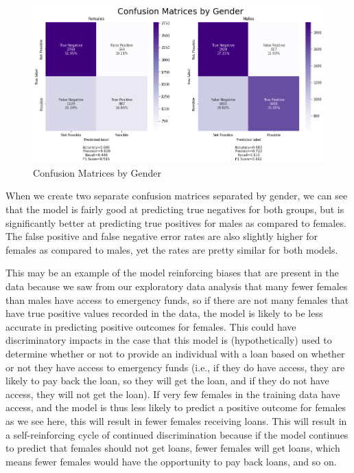 \documentclass[water,article,submit,moreauthors,pdftex]{mdpi}
\begin{document}
\begin{figure}
\centering
\includegraphics[width=\textwidth,height=0.5\textheight]{images/confusionMatrices.png}
\caption{Confusion Matrices by Gender}
\end{figure}

When we create two separate confusion matrices separated by gender, we
can see that the model is fairly good at predicting true negatives for
both groups, but is significantly better at predicting true positives
for males as compared to females. The false positive and false negative
error rates are also slightly higher for females as compared to males,
yet the rates are pretty similar for both models.

This may be an example of the model reinforcing biases that are present
in the data because we saw from our exploratory data analysis that many
fewer females than males have access to emergency funds, so if there are
not many females that have true positive values recorded in the data,
the model is likely to be less accurate in predicting positive outcomes
for females. This could have discriminatory impacts in the case that
this model is (hypothetically) used to determine whether or not to
provide an individual with a loan based on whether or not they have
access to emergency funds (i.e., if they do have access, they are likely
to pay back the loan, so they will get the loan, and if they do not have
access, they will not get the loan). If very few females in the training
data have access, and the model is thus less likely to predict a
positive outcome for females as we see here, this will result in fewer
females receiving loans. This will result in a self-reinforcing cycle of
continued discrimination because if the model continues to predict that
females should not get loans, fewer females will get loans, which means
fewer females would have the opportunity to pay back loans, and so on.
\end{document}
